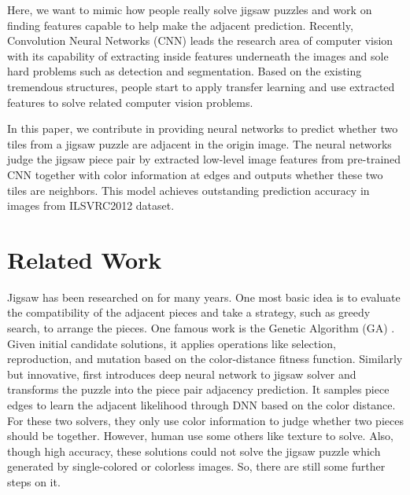\documentclass{article}
\begin{document}
Here, we want to mimic how people really solve jigsaw puzzles and work on finding features capable to help make the adjacent prediction. Recently, Convolution Neural Networks (CNN) leads the research area of computer vision with its capability of extracting inside features underneath the images and sole hard problems such as detection\cite{redmon2017yolo9000} and segmentation\cite{he2017mask,yu2015multi}. Based on the existing tremendous structures, people start to apply transfer learning and use extracted features to solve related computer vision problems\cite{razavian2014cnn}.

In this paper, we contribute in providing neural networks to predict whether two tiles from a jigsaw puzzle are adjacent in the origin image. The neural networks judge the jigsaw piece pair by extracted low-level image features from pre-trained CNN together with color information at edges and outputs whether these two tiles are neighbors. This model achieves outstanding prediction accuracy in images from ILSVRC2012 dataset\cite{ILSVRC15}.

\section{Related Work}

Jigsaw has been researched on for many years. One most basic idea is to evaluate the compatibility of the adjacent pieces and take a strategy, such as greedy search, to arrange the pieces. One famous work is the Genetic Algorithm (GA) \cite{sholomon2013genetic}. Given initial candidate solutions, it applies operations like selection, reproduction, and mutation based on the color-distance fitness function. Similarly but innovative, \cite{sholomon2016dnn} first introduces deep neural network to jigsaw solver and transforms the puzzle into the piece pair adjacency prediction. It samples piece edges to learn the adjacent likelihood through DNN based on the color distance. For these two solvers, they only use color information to judge whether two pieces should be together. However, human use some others like texture to solve. Also, though high accuracy, these solutions could not solve the jigsaw puzzle which generated by single-colored or colorless images. So, there are still some further steps on it.
\end{document}
